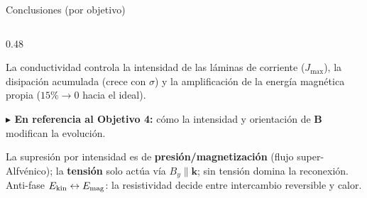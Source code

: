 \documentclass[aspectratio=169,9pt]{beamer}
\begin{document}
\begin{frame}{Conclusiones (por objetivo)}
\begin{columns}[T]
\begin{column}{0.48\textwidth}
\begin{tcolorbox}[EQ={3 · Variables globales}]
    \scriptsize
    La conductividad controla la intensidad de las l\'aminas de corriente
    ($J_{\max}$), la disipaci\'on acumulada (crece con $\sigma$) y la
    amplificaci\'on de la energ\'ia magn\'etica propia
    ($15\%\to0$ hacia el ideal).
  \end{tcolorbox}
  \pause\vspace{0.08cm}
  {\tiny\color{violet}\textbf{$\blacktriangleright$ En referencia al Objetivo 4:}
   c\'omo la intensidad y orientaci\'on de $\mathbf B$ modifican la evoluci\'on.}\\[2pt]
  \begin{tcolorbox}[EQ={4 · Intensidad y orientaci\'on de $\mathbf B$}]
    \scriptsize
    La supresi\'on por intensidad es de \textbf{presi\'on/magnetizaci\'on}
    (flujo super-Alfv\'enico); la \textbf{tensi\'on} solo act\'ua v\'ia
    $B_y\parallel\mathbf k$; sin tensi\'on domina la reconexi\'on.
    Anti-fase $E_{\rm kin}\leftrightarrow E_{\rm mag}$: la resistividad
    decide entre intercambio reversible y calor.
  \end{tcolorbox}
\end{column}
\end{columns}
\end{frame}
\end{document}
